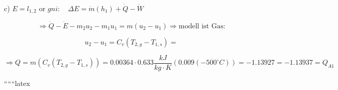 c) $E = l_{1,2} \text{ or } gni: \quad \Delta E = \dot{m} (h_1) + \dot{Q} - \dot{W}$

\[
\Rightarrow \dot{Q} - \dot{E} - m_2 u_2 - m_1 u_1 = m (u_2 - u_1) \Rightarrow \text{modell ist Gas:}
\]

\[
u_2 - u_1 = C_v (T_{2,g} - T_{1,s}) =
\]

\[
\Rightarrow Q = m \left( C_v (T_{2,g} - T_{1,s}) \right) = 0.00364 \cdot 0.633 \frac{kJ}{kg \cdot K} (0.009 (-500^\circ C)) = -1.13927 = -1.13937 = Q_{A1}
\]

``````latex